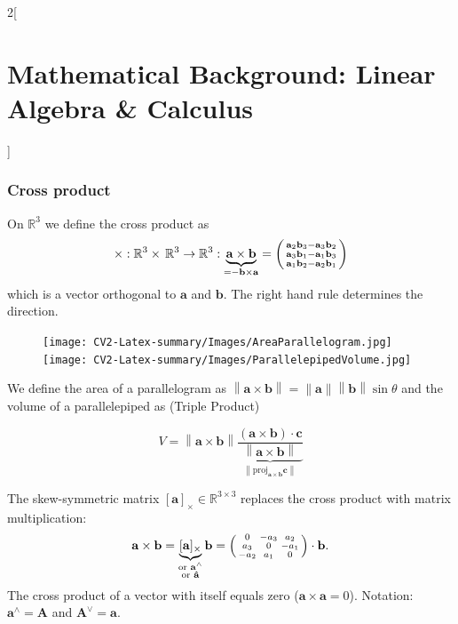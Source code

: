 \documentclass[oneside,fontsize=11pt,paper=a4]{scrartcl}
\newcommand\norm[1]{\left\lVert#1\right\rVert}
\begin{document}
\begin{multicols}{2}[\section{Mathematical Background: Linear Algebra \& Calculus}]
\subsubsection{Cross product} \label{subsection:cross_product_skew}
On $\mathbb{R}^3$ we define the cross product as
\begin{equation*}
\begin{split}
    \times : \mathbb{R}^3 \times \, \mathbb{R}^3 \rightarrow \mathbb{R}^3: \underbrace{\mathbf{a} \times \mathbf{b}}_{= -\mathbf{b} \times \mathbf{a}} =  \begin{psmallmatrix} \mathbf{a}_2\mathbf{b}_3 - \mathbf{a}_3\mathbf{b}_2\\ \mathbf{a}_3\mathbf{b}_1 - \mathbf{a}_1\mathbf{b}_3\\
    \mathbf{a}_1\mathbf{b}_2 - \mathbf{a}_2\mathbf{b}_1 
    \end{psmallmatrix}
\end{split}
\end{equation*}
which is a vector orthogonal to $\mathbf{a}$ and $\mathbf{b}$. The right hand rule determines the direction.
\begin{figure}
    \texttt{[image: CV2-Latex-summary/Images/AreaParallelogram.jpg]}
    \texttt{[image: CV2-Latex-summary/Images/ParallelepipedVolume.jpg]}
\end{figure}
We define the area of a parallelogram as
$\norm{\mathbf{a} \times \mathbf{b}}=\norm{\mathbf{a}}\norm{\mathbf{b}}\sin\theta$ and the volume of a parallelepiped as (Triple Product)

$$V=\norm{\mathbf{a} \times \mathbf{b}}\underbrace{\frac{(\mathbf{a} \times \mathbf{b})\cdot\mathbf{c}}{\norm{\mathbf{a} \times \mathbf{b}}}}_{\norm{\text{proj}_{\mathbf{a} \times \mathbf{b}}\mathbf{c}}}$$ 

The skew-symmetric matrix $\mathbf{[a]_\times} \in \mathbb{R}^{3 \times 3}$ replaces the cross product with matrix multiplication:
\begin{equation*}
     \mathbf{a} \times \mathbf{b} = \underbrace{\mathbf{[a]_\times}}_{\substack{\text{or }\mathbf{a}^\wedge\\\text{or }\mathbf{\hat{a}}}}\mathbf{b} = \begin{psmallmatrix} 0 & -a_3 & a_2\\ a_3 & 0 & -a_1\\ -a_2 & a_1 & 0 \end{psmallmatrix} \cdot \mathbf{b}.
\end{equation*}
The cross product of a vector with itself equals zero ($\mathbf{a} \times \mathbf{a} = 0$). Notation: $\mathbf{a}^\wedge=\mathbf{A}$ and $\mathbf{A}^{\vee}=\mathbf{a}$.


\end{multicols}
\end{document}
